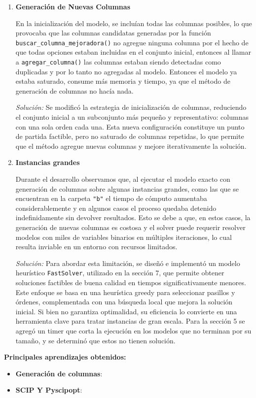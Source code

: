 \documentclass[a4paper,12pt]{article}
\begin{document}
\begin{enumerate}

    \item \textbf{Generación de Nuevas Columnas}
    
    En la inicialización del modelo, se incluían todas las columnas posibles, lo que provocaba que las columnas candidatas generadas por la función \texttt{buscar\_columna\_mejoradora()} no agregue ninguna columna por el hecho de que todas opciones estaban incluidas en el conjunto inicial, entonces al llamar a \texttt{agregar\_columna()} las columnas estaban siendo detectadas como duplicadas y por lo tanto no agregadas al modelo. Entonces el modelo ya estaba saturado, consume más memoria y tiempo, ya que el método de generación de columnas no hacía nada. 
    
    \emph{Solución:} Se modificó la estrategia de inicialización de columnas, reduciendo el conjunto inicial a un subconjunto más pequeño y representativo: columnas con una sola orden cada una. Esta nueva configuración constituye un punto de partida factible, pero no saturado de columnas repetidas, lo que permite que el método agregue nuevas columnas y mejore iterativamente la solución.

    \item \textbf{Instancias grandes}
    
    Durante el desarrollo observamos que, al ejecutar el modelo exacto con generación de columnas sobre algunas instancias grandes, como las que se encuentran en la carpeta \texttt{"b"} el tiempo de cómputo aumentaba considerablemente y en algunos casos el proceso quedaba detenido indefinidamente sin devolver resultados. Esto se debe a que, en estos casos, la generación de nuevas columnas es costosa y el solver puede requerir resolver modelos con miles de variables binarios en múltiples iteraciones, lo cual resulta inviable en un entorno con recursos limitados.
    
    \emph{Solución:} Para abordar esta limitación, se diseñó e implementó un modelo heurístico \texttt{FastSolver}, utilizado en la sección 7, que permite obtener soluciones factibles de buena calidad en tiempos significativamente menores. Este enfoque se basa en una heurística greedy para seleccionar pasillos y órdenes, complementada con una búsqueda local que mejora la solución inicial. Si bien no garantiza optimalidad, su eficiencia lo convierte en una herramienta clave para tratar instancias de gran escala. Para la sección 5 se agregó un timer que corta la ejecución en los modelos que no terminan por su tamaño, y se determinó que estos no tienen solución. 

\end{enumerate}

\textbf{Principales aprendizajes obtenidos:}

\begin{itemize}
    \item \textbf{Generación de columnas}: 
    \item \textbf{SCIP Y Pyscipopt}:
    
\end{itemize}
\end{document}
